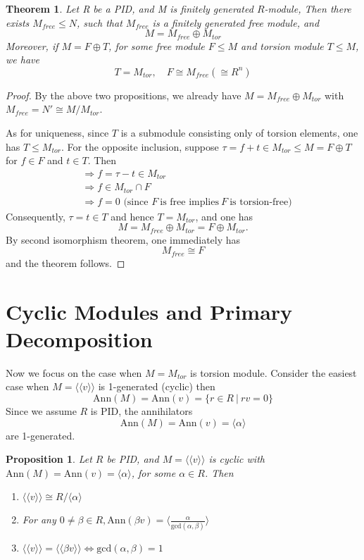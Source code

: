 \documentclass[11pt,openany]{book}
\theoremstyle{plain}
\newtheorem{theorem}{Theorem}[chapter]
\newtheorem{proposition}[proposition]{Proposition}
\theoremstyle{definition}
\theoremstyle{remark}
\begin{document}
\begin{theorem}
    Let R be a PID, and M is finitely generated $R$-module, Then there exists $M_{free}\leq N$, such that $M_{free}$ is a finitely generated free module, and 
    $$M=M_{free}\oplus M_{tor}$$
    Moreover, if $M=F\oplus T$, for some free module $F\leq M$ and torsion module $T\leq M$, we have 
    $$T=M_{tor},\quad F\cong M_{free}(\cong R^n)$$
\end{theorem}

\begin{proof}
    By the above two propositions, we already have 
    $M= M_{free} \oplus M_{tor}$ with $M_{free} = N'\cong M/M_{tor}$.

    As for uniqueness, since $T$ is a submodule consisting only of torsion elements, one has $T\leq M_{tor}$. For the opposite inclusion, suppose $\tau = f+t\in M_{tor}\leq M=F\oplus T$
    for $f \in F$ and $t \in T$. Then
    \begin{align*}
        &\Rightarrow f=\tau-t \in M_{tor} \\
        &\Rightarrow f\in M_{tor} \cap F \\
        &\Rightarrow f=0 \text{ (since } F\ \text{is free implies}\ F\ \text{is torsion-free)}
    \end{align*}
    Consequently, $\tau=t\in T$ and hence $T = M_{tor}$, and one has
    $$M=M_{free}\oplus M_{tor}=F\oplus M_{tor}.$$
    By second isomorphism theorem, one immediately has $$M_{free}\cong F$$
    and the theorem follows.
\end{proof}

\section{Cyclic Modules and Primary Decomposition}
Now we focus on the case when $M=M_{tor}$ is torsion module. Consider the easiest case when
$M=\langle\langle v \rangle\rangle$ is 1-generated (cyclic) then
$$\mathrm{Ann}(M)=\mathrm{Ann}(v)=\{r\in R\ |\ rv=0\}$$
Since we assume $R$ is PID, the annihilators
$$\mathrm{Ann}(M)=\mathrm{Ann}(v)=\langle \alpha \rangle $$ 
are 1-generated.

\begin{proposition} \label{prop-cyclic}
    Let $R$ be PID, and $M=\langle\langle v \rangle\rangle$ is cyclic with $\mathrm{Ann}(M)=\mathrm{Ann}(v)=\langle \alpha \rangle$, for some $\alpha\in R$. Then
    \begin{enumerate}
        \item $\langle\langle v \rangle\rangle \cong R/\langle \alpha \rangle$
        \item For any $0\neq\beta \in R, \mathrm{Ann}(\beta v)=\langle \frac{\alpha}{\mathrm{gcd}(\alpha , \beta)}\rangle$
        \item $\langle \langle v\rangle \rangle = \langle\langle \beta v\rangle\rangle \Leftrightarrow \mathrm{gcd}(\alpha,\beta)=1$
    \end{enumerate}
\end{proposition}
\end{document}
